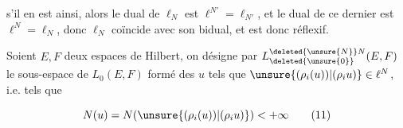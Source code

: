 \margin{\textcolor{red}{?}}

 s'il en est ainsi, alors le dual de $\ell_N$ est $\ell^{N'}=\ell_{N'}$, et le dual de ce dernier est $\ell^N=\ell_N$, donc $\ell_N$ coïncide avec son bidual, et est donc réflexif.

 Soient $E,F$ deux espaces de Hilbert,  on désigne par $L^{\deleted{\unsure{N}}N}_{\deleted{\unsure{0}}}(E,F)$ le  sous-espace de $L_0(E,F)$ formé des $u$ tels que $\unsure{(\rho_i(u))|(\rho_i u)}\in\ell^N$, i.e. tels que

\[
N(u)=N(\unsure{(\rho_i(u))|(\rho_i u)})<+\infty\tag*{(11)}
\]

